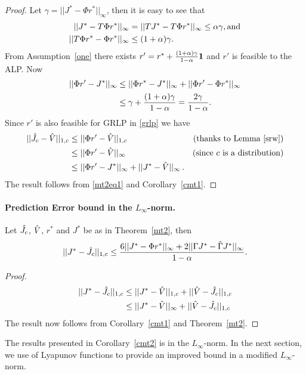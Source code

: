 \begin{proof}
Let $\gamma=||J^*-\Phi r^*||_\infty$, then  it is easy to see that
\begin{align}
||J^*-T\Phi r^*||_\infty&=||TJ^*-T\Phi r^*||_\infty\leq\alpha\gamma,\relax{ }\text{and}\nonumber\\
||T\Phi r^*-\Phi r^*||_\infty&\leq(1+\alpha)\gamma.
\end{align}
From Assumption~\ref{one} there exists $r'= r^*+\frac{(1+\alpha)\gamma}{1-\alpha}\mathbf{1}$ and $r'$ is feasible to the ALP. 
Now
\begin{align}
||\Phi r'-J^*||_\infty&\leq ||\Phi r^* -J^*||_\infty+||\Phi r'-\Phi r^*||_\infty\nn\\&\leq \gamma+\frac{(1+\alpha)\gamma}{1-\alpha}=\frac{2\gamma}{1-\alpha}.
\label{mt2eq1}
\end{align}
Since $r'$ is also feasible for GRLP in \eqref{grlp} we have
\begin{align}
||\hj-\hv||_{1,c}&\leq||\Phi r'-\hv||_{1,c}\nn &(\text{thanks to Lemma~\ref{srw}}) \\ %
&\leq||\Phi r'-\hv||_\infty\mb & (\text{since $c$ is a distribution})\nn\\
&\leq||\Phi r'-J^*||_\infty+||J^*-\hv||_\infty\,.\nn
\end{align}
The result follows from \eqref{mt2eq1} and Corollary~\ref{cmt1}.
\end{proof}

\paragraph{Prediction Error bound in the $L_\infty$-norm.}
\begin{corollary}\label{cmt2}
Let $\hat{J}_c$, $\hat{V}$, $r^*$ and $J^*$ be as in Theorem~\ref{mt2}, then 
\begin{align}\label{finalbnd}
||J^*-\hj||_{1,c}\leq\frac{6 ||J^*-\Phi r^*||_\infty+2||\Gamma J^*-\hg J^*||_\infty}{1-\alpha}.
\end{align}
\end{corollary}
\begin{proof}
\begin{align}
||J^*-\hat{J}_c||_{1,c}&\leq||J^*-\hat{V}||_{1,c}+||\hat{V}-\hat{J}_c||_{1,c}\nonumber\\
&\leq||J^*-\hat{V}||_\infty+||\hat{V}-\hat{J}_c||_{1,c}\nonumber
\end{align}
The result now follows from Corollary~\ref{cmt1} and Theorem~\ref{mt2}.
\end{proof}
The results presented in Corollary~\ref{cmt2} is in the $L_\infty$-norm. In the next section, we use of Lyapunov functions to provide an improved bound in a modified $L_\infty$-norm.
